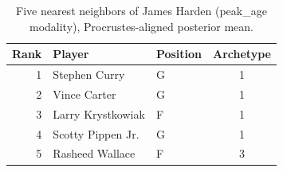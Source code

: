 \begin{table}[htbp]
  \centering\small
  \begin{tabular}{rllc}
    \toprule
    Rank & Player & Position & Archetype \\
    \midrule
    1 & Stephen Curry & G & 1 \\
    2 & Vince Carter & G & 1 \\
    3 & Larry Krystkowiak & F & 1 \\
    4 & Scotty Pippen Jr. & G & 1 \\
    5 & Rasheed Wallace & F & 3 \\
    \bottomrule
  \end{tabular}
  \caption{Five nearest neighbors of James Harden (peak_age modality), Procrustes-aligned posterior mean.}
  \label{tab:James_Harden_neighbors_peak_age}
\end{table}

